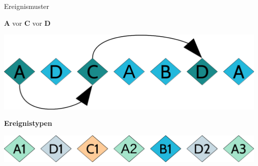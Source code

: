 \documentclass[usenames,dvipsnames]{beamer}
\begin{document}
\begin{frame}{Ereignismuster}

\begin{exampleblock}{}
    \begin{center}
        \textbf{A} vor \textbf{C} vor \textbf{D}    
    \end{center}
\end{exampleblock}

\begin{center}
    \includegraphics[scale=0.3]{img/03_cep}
\end{center}
\begin{exampleblock}{}
    \begin{center}
        \textbf{Ereignistypen}  
    \end{center}
\end{exampleblock}


\begin{center}
    \includegraphics[scale=0.3]{img/04_cep}
\end{center}

\end{frame}
\end{document}
